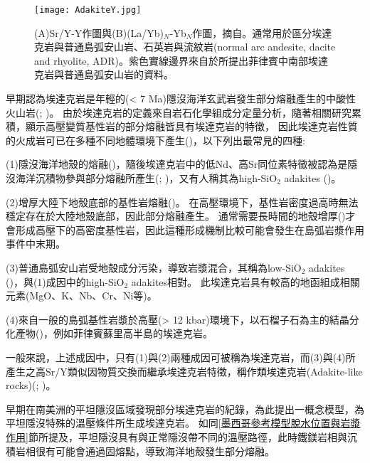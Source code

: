 \begin{figure*}[h]
    \centering
    \texttt{[image: AdakiteY.jpg]}
    \caption[Sr/Y-Y作圖與(La/Yb)$_N$-Yb$_N$作圖]{(A)Sr/Y-Y作圖與(B)(La/Yb)$_N$-Yb$_N$作圖，摘自\citealp{castillo2012adakite}。通常用於區分埃達克岩與普通島弧安山岩、石英岩與流紋岩(normal arc andesite, dacite and rhyolite, ADR)。紫色實線邊界來自於\citealp{richards2007special}所提出菲律賓中南部埃達克岩與普通島弧安山岩的資料。}
    \label{fig::AdakiteY}
\end{figure*}

早期認為埃達克岩是年輕的(< 7 Ma)隱沒海洋玄武岩發生部分熔融產生的中酸性火山岩(\citealp{defant1990derivation}; \citealp{peacock1994partial})。
由於埃達克岩的定義來自岩石化學組成分定量分析，隨著相關研究累積，顯示高壓變質基性岩的部分熔融皆具有埃達克岩的特徵，
因此埃達克岩性質的火成岩可已在多種不同地體環境下產生(\citealp{martin2005overview})，以下列出最常見的四種:

(1)隱沒海洋地殼的熔融(\citealp{defant1990derivation})，隨後埃達克岩中的低Nd、高Sr同位素特徵被認為是隱沒海洋沉積物參與部分熔融所產生(\citealp{stern1996role}; \citealp{gomez2003temporal})，又有人稱其為high-SiO$_2$ adakites (\citealp{martin2005overview})。

(2)增厚大陸下地殼底部的基性岩熔融(\citealp{kay1996magmatic})。
在高壓環境下，基性岩密度過高時無法穩定存在於大陸地殼底部，因此部分熔融產生。
通常需要長時間的地殼增厚(\citealp{kay2002magmatism})才會形成高壓下的高密度基性岩，因此這種形成機制比較可能會發生在島弧岩漿作用事件中末期。

(3)普通島弧安山岩受地殼成分污染，導致岩漿混合，其稱為low-SiO$_2$ adakites (\citealp{martin2005overview})，與(1)成因中的high-SiO$_2$ adakites相對。
此埃達克岩具有較高的地函組成相關元素(MgO、K、Nb、Cr、Ni等)。

(4)來自一般的島弧基性岩漿於高壓(> 12 kbar)環境下，以石榴子石為主的結晶分化產物(\citealp{moyen2009high})，例如菲律賓蘇里高半島的埃達克岩。

一般來說，上述成因中，只有(1)與(2)兩種成因可被稱為埃達克岩，而(3)與(4)所產生之高Sr/Y類似因物質交換而繼承埃達克岩特徵，稱作類埃達克岩(Adakite-like rocks)(\citealp{kay2002magmatism}; \citealp{goss2013andean})。

早期在南美洲的平坦隱沒區域發現部分埃達克岩的紀錄，\citealp{Gutscher2000Bcan}為此提出一概念模型，為平坦隱沒特殊的溫壓條件所生成埃達克岩。
如同\ref{墨西哥參考模型脫水位置與岩漿作用}節所提及，平坦隱沒具有與正常隱沒帶不同的溫壓路徑，此時鐵鎂岩相與沉積岩相很有可能會通過固熔點，導致海洋地殼發生部分熔融。

